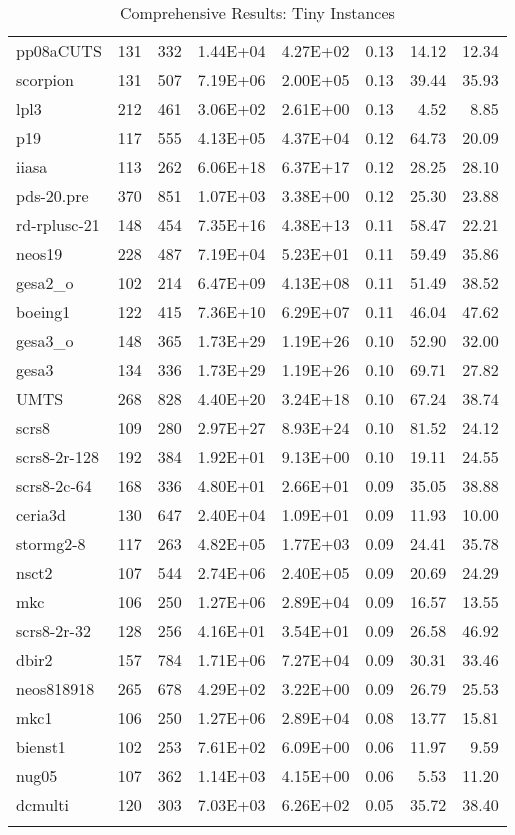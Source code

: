 \documentclass[10pt]{article}
\begin{document}
\begin{longtable}{|l|r|r|r|r|r|r|r|}
pp08aCUTS	&	131	&	332	&	1.44E+04	&	4.27E+02	&	0.13	&	14.12	&	12.34	\\
scorpion	&	131	&	507	&	7.19E+06	&	2.00E+05	&	0.13	&	39.44	&	35.93	\\
lpl3	&	212	&	461	&	3.06E+02	&	2.61E+00	&	0.13	&	4.52	&	8.85	\\
p19	&	117	&	555	&	4.13E+05	&	4.37E+04	&	0.12	&	64.73	&	20.09	\\
iiasa	&	113	&	262	&	6.06E+18	&	6.37E+17	&	0.12	&	28.25	&	28.10	\\
pds-20.pre	&	370	&	851	&	1.07E+03	&	3.38E+00	&	0.12	&	25.30	&	23.88	\\
rd-rplusc-21	&	148	&	454	&	7.35E+16	&	4.38E+13	&	0.11	&	58.47	&	22.21	\\
neos19	&	228	&	487	&	7.19E+04	&	5.23E+01	&	0.11	&	59.49	&	35.86	\\
gesa2\_o	&	102	&	214	&	6.47E+09	&	4.13E+08	&	0.11	&	51.49	&	38.52	\\
boeing1	&	122	&	415	&	7.36E+10	&	6.29E+07	&	0.11	&	46.04	&	47.62	\\
gesa3\_o	&	148	&	365	&	1.73E+29	&	1.19E+26	&	0.10	&	52.90	&	32.00	\\
gesa3	&	134	&	336	&	1.73E+29	&	1.19E+26	&	0.10	&	69.71	&	27.82	\\
UMTS	&	268	&	828	&	4.40E+20	&	3.24E+18	&	0.10	&	67.24	&	38.74	\\
scrs8	&	109	&	280	&	2.97E+27	&	8.93E+24	&	0.10	&	81.52	&	24.12	\\
scrs8-2r-128	&	192	&	384	&	1.92E+01	&	9.13E+00	&	0.10	&	19.11	&	24.55	\\
scrs8-2c-64	&	168	&	336	&	4.80E+01	&	2.66E+01	&	0.09	&	35.05	&	38.88	\\
ceria3d	&	130	&	647	&	2.40E+04	&	1.09E+01	&	0.09	&	11.93	&	10.00	\\
stormg2-8	&	117	&	263	&	4.82E+05	&	1.77E+03	&	0.09	&	24.41	&	35.78	\\
nsct2	&	107	&	544	&	2.74E+06	&	2.40E+05	&	0.09	&	20.69	&	24.29	\\
mkc	&	106	&	250	&	1.27E+06	&	2.89E+04	&	0.09	&	16.57	&	13.55	\\
scrs8-2r-32	&	128	&	256	&	4.16E+01	&	3.54E+01	&	0.09	&	26.58	&	46.92	\\
dbir2	&	157	&	784	&	1.71E+06	&	7.27E+04	&	0.09	&	30.31	&	33.46	\\
neos818918	&	265	&	678	&	4.29E+02	&	3.22E+00	&	0.09	&	26.79	&	25.53	\\
mkc1	&	106	&	250	&	1.27E+06	&	2.89E+04	&	0.08	&	13.77	&	15.81	\\
bienst1	&	102	&	253	&	7.61E+02	&	6.09E+00	&	0.06	&	11.97	&	9.59	\\
nug05	&	107	&	362	&	1.14E+03	&	4.15E+00	&	0.06	&	5.53	&	11.20	\\
dcmulti	&	120	&	303	&	7.03E+03	&	6.26E+02	&	0.05	&	35.72	&	38.40	\\
\hline
\caption{Comprehensive Results: Tiny Instances}
\small
\centering
\label{supptab:all_tiny}
\end{longtable}
\end{document}
